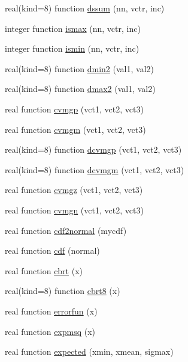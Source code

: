 \begin{DoxyCompactItemize}
\item 
real(kind=8) function \hyperlink{numutils_8f90_a9b243859cd189efa9b00cbcbacd2821a}{dssum} (nn, vctr, inc)
\item 
integer function \hyperlink{numutils_8f90_ad3b82c055ab73b63143599d64cace13a}{ismax} (nn, vctr, inc)
\item 
integer function \hyperlink{numutils_8f90_ab72ba2f2e7d017371d2a6c89fc105b7f}{ismin} (nn, vctr, inc)
\item 
real(kind=8) function \hyperlink{numutils_8f90_aa7a205cbf8a32965ebe23cee98216831}{dmin2} (val1, val2)
\item 
real(kind=8) function \hyperlink{numutils_8f90_a15243bd780e6bfd76624addc751b19b2}{dmax2} (val1, val2)
\item 
real function \hyperlink{numutils_8f90_a370b2f89b91abdefc6837be3a7dfbc67}{cvmgp} (vct1, vct2, vct3)
\item 
real function \hyperlink{numutils_8f90_a47eb1cfcc10ded0ae62fe3cc437175a7}{cvmgm} (vct1, vct2, vct3)
\item 
real(kind=8) function \hyperlink{numutils_8f90_a89ecc6c9027a764bd346eaccf2b16472}{dcvmgp} (vct1, vct2, vct3)
\item 
real(kind=8) function \hyperlink{numutils_8f90_a358d33fa0dec505220cafbb976908544}{dcvmgm} (vct1, vct2, vct3)
\item 
real function \hyperlink{numutils_8f90_aa9f857be87382719a198da9421f50035}{cvmgz} (vct1, vct2, vct3)
\item 
real function \hyperlink{numutils_8f90_ab8aaf2315448d4f38cd2353d5a6178d3}{cvmgn} (vct1, vct2, vct3)
\item 
real function \hyperlink{numutils_8f90_a05b7de4f3d36d86202d1f3f61491a729}{cdf2normal} (mycdf)
\item 
real function \hyperlink{numutils_8f90_a67a629f40f64f953b249decc124c6542}{cdf} (normal)
\item 
real function \hyperlink{numutils_8f90_abee471b10b1564285b25aa1b7b6f1577}{cbrt} (x)
\item 
real(kind=8) function \hyperlink{numutils_8f90_ad4b910be4531c088be1d1e83197aa36e}{cbrt8} (x)
\item 
real function \hyperlink{numutils_8f90_a2995da91cff4b36beeb6cbdae2c3bbc4}{errorfun} (x)
\item 
real function \hyperlink{numutils_8f90_a7ddf1b8366e0d92b4fcd8dffd35f00ce}{expmsq} (x)
\item 
real function \hyperlink{numutils_8f90_a595597b0b2299bf9f95be792c484b020}{expected} (xmin, xmean, sigmax)

\end{DoxyCompactItemize}
